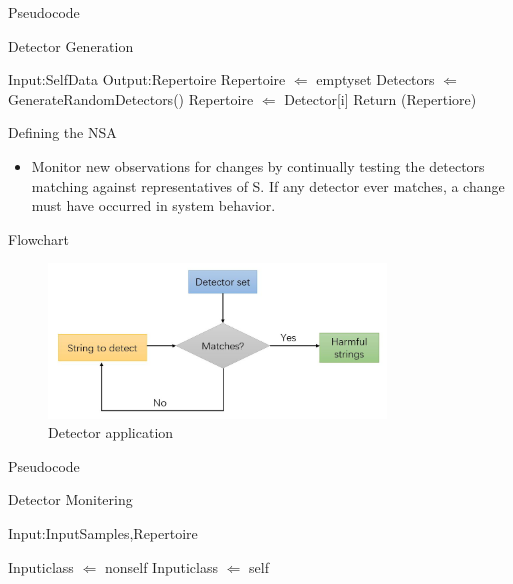 \begin{frame}{Pseudocode}
 \begin{algorithm}[H]
  \caption{Detector Generation}          
  \label{alg1}      %
    \begin{algorithmic}  
       \STATE Input:SelfData
       \STATE Output:Repertoire
       \STATE Repertoire $\Leftarrow$ emptyset
       \STATE Detectors $\Leftarrow$ GenerateRandomDetectors()
       \STATE Repertoire $\Leftarrow$ Detector[i]
       \ENDIF
       \ENDFOR
       \ENDWHILE
       \STATE Return (Repertiore)

    \end{algorithmic}
  \end{algorithm} 
\end{frame}

\begin{frame}{Defining the NSA}
  \begin{itemize}
  \item {
    Monitor new observations for changes by continually testing the detectors matching against representatives of S.  If any detector ever matches, a change must have occurred in system behavior.
  }
  \end{itemize}
\end{frame}

\begin{frame}{Flowchart}
  \begin{figure}[hb]
  \centering
  \includegraphics[width=0.8\textwidth]{img/NSAflowchart2.jpg}
  \caption{Detector application}
  \end{figure}
\end{frame}

\begin{frame}{Pseudocode}
 \begin{algorithm}[H]
  \caption{Detector Monitering}          
  \label{alg2}      
    \begin{algorithmic}  
       \STATE Input:InputSamples,Repertoire
  
       \STATE Inputiclass $\Leftarrow$ nonself  
       \STATE Inputiclass $\Leftarrow$ self
       \ENDIF
       \ENDFOR
       \ENDFOR            
    \end{algorithmic}
  \end{algorithm} 
\end{frame}
